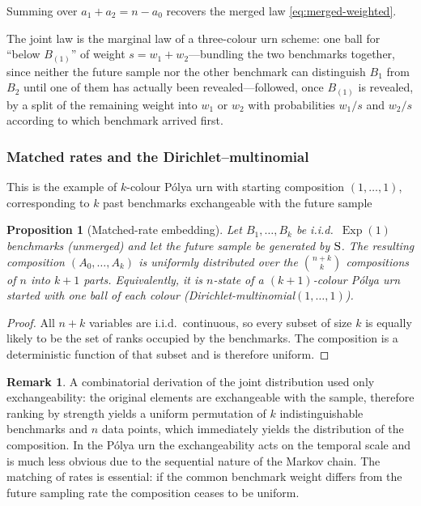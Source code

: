 \documentclass[11pt]{article}
\DeclareMathOperator{\Exp}{Exp}
\theoremstyle{plain}
\newtheorem{proposition}[theorem]{Proposition}
\theoremstyle{definition}
\newtheorem{remark}[theorem]{Remark}
\begin{document}
Summing over \(a_1+a_2=n-a_0\) recovers the merged law \eqref{eq:merged-weighted}.
 

The joint law is the marginal law of a three-colour urn scheme: one ball for ``below \(B_{(1)}\)'' of weight \(s=w_1+w_2\)---bundling the two benchmarks together, since neither the future sample nor the other benchmark can distinguish \(B_1\) from \(B_2\) until one of them has actually been revealed---followed, once \(B_{(1)}\) is revealed, by a split of the remaining weight into \(w_1\) or \(w_2\) with probabilities \(w_1/s\) and \(w_2/s\) according to which benchmark arrived first.

\subsubsection{Matched rates and the Dirichlet--multinomial}
\label{sec:matched}
 This is  the example of $k$-colour  P{\'o}lya urn with starting composition $(1,\ldots,1)$, corresponding
to $k$ past benchmarks exchangeable with the  future sample 
\begin{proposition}[Matched-rate embedding]
\label{prop:matched}
Let \(B_1,\dots,B_k\) be i.i.d.\ \(\Exp(1)\) benchmarks (unmerged) and let the future sample be generated by \({\rm S}\). The resulting composition \((A_0,\dots,A_k)\) is uniformly distributed over the \(\binom{n+k}{k}\) compositions of \(n\) into \(k+1\) parts. Equivalently, it is $n$-state of a \((k+1)\)-colour P\'olya urn started with one ball of each colour (Dirichlet-multinomial\((1,\dots,1)\)).
\end{proposition}
 
\begin{proof}
All \(n+k\) variables are i.i.d.\ continuous, so every subset of size \(k\) is equally likely to be the set of ranks occupied by the benchmarks. The composition is a deterministic function of that subset and is therefore uniform.
\end{proof}

\begin{remark}
A combinatorial derivation of the joint distribution used only exchangeability: the original elements are exchangeable  with the sample, therefore ranking by strength yields a uniform permutation
of $k$ indistinguishable benchmarks and $n$ data points, which immediately yields the distribution of the composition. In the P{\'o}lya urn the exchangeability acts on the temporal scale and is much less obvious due to the sequential nature of the Markov chain. 
The matching of rates is essential: if the common benchmark weight differs from the future sampling rate the composition ceases to be uniform.
\end{remark}
\end{document}
